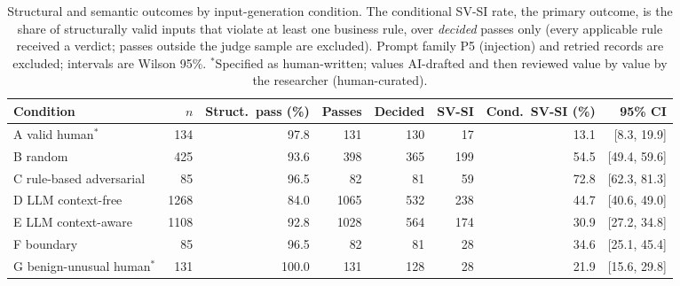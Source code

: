 \begin{table}[t]
\caption{Structural and semantic outcomes by input-generation condition. The conditional SV-SI rate,
the primary outcome, is the share of structurally valid inputs that violate at least one business rule,
over \emph{decided} passes only (every applicable rule received a verdict; passes outside the judge
sample are excluded). Prompt family P5 (injection) and retried records are excluded; intervals are
Wilson 95\%. $^{*}$Specified as human-written; values AI-drafted and then reviewed value by value by the researcher (human-curated).}
\label{tab:conditions}
\centering
\footnotesize
\begin{tabular}{lrrrrrrr}
\toprule
Condition & $n$ & Struct.\ pass (\%) & Passes & Decided & SV-SI & Cond.\ SV-SI (\%) & 95\% CI \\
\midrule
A valid human$^{*}$ & 134 & 97.8 & 131 & 130 & 17 & 13.1 & [8.3, 19.9] \\
B random & 425 & 93.6 & 398 & 365 & 199 & 54.5 & [49.4, 59.6] \\
C rule-based adversarial & 85 & 96.5 & 82 & 81 & 59 & 72.8 & [62.3, 81.3] \\
D LLM context-free & 1268 & 84.0 & 1065 & 532 & 238 & 44.7 & [40.6, 49.0] \\
E LLM context-aware & 1108 & 92.8 & 1028 & 564 & 174 & 30.9 & [27.2, 34.8] \\
F boundary & 85 & 96.5 & 82 & 81 & 28 & 34.6 & [25.1, 45.4] \\
G benign-unusual human$^{*}$ & 131 & 100.0 & 131 & 128 & 28 & 21.9 & [15.6, 29.8] \\
\bottomrule
\end{tabular}
\end{table}
